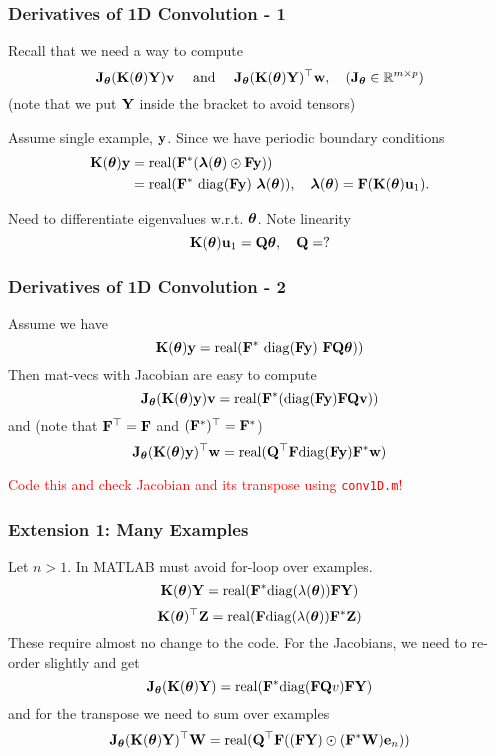 \documentclass[12pt,fleqn,handout]{beamer}
\begin{document}
\begin{frame}\frametitle{Derivatives of 1D Convolution - 1}
	Recall that we need a way to compute
	$$
		{\bf J}_{\boldsymbol \theta} ({\bf K}({\boldsymbol \theta}){\bf Y}) {\bf v} \quad \text{ and } \quad {\bf J}_{\boldsymbol \theta} ({\bf K}({\boldsymbol \theta}){\bf Y})^\top {\bf w}, \quad ({\bf J}_{\boldsymbol \theta} \in\mathbb{R}^{m \times p})
	$$
	(note that we put ${\bf Y}$ inside the bracket to avoid tensors)

	\bigskip
	\pause
	
	Assume single example, ${\bf y}$. Since we have periodic boundary conditions
	\begin{equation*}
		\begin{split}
	   {\bf K}({\boldsymbol \theta}){\bf y} & =  {\rm real}({\bf F}^*( {\boldsymbol \lambda}({\boldsymbol \theta}) \odot {\bf F} {\bf y})) \\
	                     & = {\rm real}( {\bf F}^* \ {\rm diag}({\bf F} {\bf y}) \ {\boldsymbol \lambda}({\boldsymbol \theta})), \quad 		{\boldsymbol \lambda}({\boldsymbol \theta}) = {\bf F}({\bf K}({\boldsymbol \theta}){\bf u}_1).
		\end{split}
	\end{equation*}
	\pause
	
	Need to differentiate eigenvalues w.r.t. ${\boldsymbol \theta}$. Note linearity
	$$
		{\bf K}({\boldsymbol \theta}) {\bf u}_1 = {\bf Q} {\boldsymbol \theta}, \quad {\bf Q} = ?
	$$
	
\end{frame}

\begin{frame} \frametitle{Derivatives of 1D Convolution - 2}
	Assume we have
	$$
		{\bf K}({\boldsymbol \theta}) {\bf y}  = {\rm real}( {\bf F}^* \ {\rm diag}({\bf F} {\bf y}) \ {\bf F} {\bf Q} {\boldsymbol \theta}))
	$$
	Then mat-vecs with Jacobian are easy to compute
	$$
		{\bf J}_{\boldsymbol \theta} ( {\bf K}({\boldsymbol \theta}) {\bf y}) {\bf v} = {\rm real}( {\bf F}^* ({\rm diag}({\bf F} {\bf y})  {\bf F} {\bf Q} {\bf v}))
	$$
	\pause
	and (note that ${\bf F}^\top = {\bf F}$ and $({\bf F}^*)^\top = {\bf F}^*$)
	$$
		{\bf J}_{\boldsymbol \theta} ({\bf K}({\boldsymbol \theta}) {\bf y})^\top {\bf w} = {\rm real}({\bf Q}^\top {\bf F}  {\rm diag}({\bf F} {\bf y}){\bf F}^* {\bf w})
	$$
	
	\bigskip
	\pause
	
	\begin{center}
		\textcolor{red}{Code this and check Jacobian and its transpose using \texttt{conv1D.m}!}
	\end{center}
	
\end{frame}

\begin{frame}
	\frametitle{Extension 1: Many Examples}
	
	Let $n>1$. In MATLAB must avoid for-loop over examples. 
	$$
		{\bf K}({\boldsymbol \theta}){\bf Y} =  {\rm real}({\bf F}^* {\rm diag}(\lambda({\boldsymbol \theta})) {\bf F} {\bf Y})
	$$
	$$
		 {\bf K}({\boldsymbol \theta})^\top{\bf Z} =  {\rm real}({\bf F} {\rm diag}(\lambda({\boldsymbol \theta})) {\bf F}^* {\bf Z})
	$$
	These require almost no change to the code. For the Jacobians, we need to re-order slightly and get
	$$
		{\bf J}_{\boldsymbol \theta} ({\bf K}({\boldsymbol \theta}){\bf Y}) = {\rm real}({\bf F}^* {\rm diag}({\bf F} {\bf Q} v) {\bf F} {\bf Y})
	$$
	and for the transpose we need to sum over examples
	$$
		{\bf J}_{\boldsymbol \theta}({\bf K}({\boldsymbol \theta}){\bf Y})^\top{\bf W} = {\rm real}({\bf Q}^\top {\bf F}  (({\bf F}{\bf Y}) \odot ({\bf F}^* {\bf W}) {\bf e}_n))
	$$
	
\end{frame}
\end{document}
